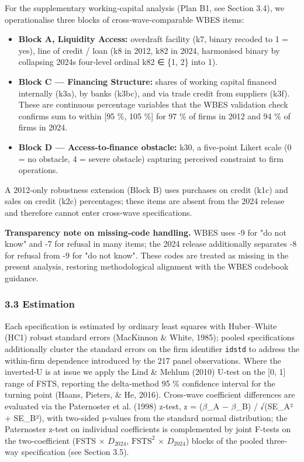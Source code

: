 \documentclass[12pt,a4paper]{article}
\providecommand{\tightlist}{\setlength{\itemsep}{0pt}\setlength{\parskip}{0pt}}
\begin{document}
For the supplementary working‑capital analysis (Plan B1, see Section
3.4), we operationalise three blocks of cross‑wave‑comparable WBES
items:

\begin{itemize}
\tightlist
\item
  \textbf{Block A, Liquidity Access:} overdraft facility (k7, binary
  recoded to 1 = yes), line of credit / loan (k8 in 2012, k82 in 2024,
  harmonised binary by collapsing 2024\textquotesingle s four‑level
  ordinal k82 ∈ \{1, 2\} into 1).
\item
  \textbf{Block C --- Financing Structure:} shares of working capital
  financed internally (k3a), by banks (k3bc), and via trade credit from
  suppliers (k3f). These are continuous percentage variables that the
  WBES validation check confirms sum to within {[}95 \%, 105 \%{]} for
  97 \% of firms in 2012 and 94 \% of firms in 2024.
\item
  \textbf{Block D --- Access‑to‑finance obstacle:} k30, a five‑point
  Likert scale (0 = no obstacle, 4 = severe obstacle) capturing
  perceived constraint to firm operations.
\end{itemize}

A 2012‑only robustness extension (Block B) uses purchases on credit
(k1c) and sales on credit (k2c) percentages; these items are absent from
the 2024 release and therefore cannot enter cross‑wave specifications.

\textbf{Transparency note on missing‑code handling.} WBES uses -9 for
"do not know" and -7 for refusal in many items; the 2024 release
additionally separates -8 for refusal from -9 for "do not know". These
codes are treated as missing in the present analysis, restoring
methodological alignment with the WBES codebook guidance.

\hypertarget{33-estimation}{%
\subsubsection{3.3 Estimation}\label{33-estimation}}

Each specification is estimated by ordinary least squares with
Huber--White (HC1) robust standard errors (MacKinnon \& White, 1985);
pooled specifications additionally cluster the standard errors on the
firm identifier \texttt{idstd} to address the within-firm dependence
introduced by the 217 panel observations. Where the inverted‑U is at
issue we apply the Lind \& Mehlum (2010) U‑test on the {[}0, 1{]} range
of FSTS, reporting the delta‑method 95 \% confidence interval for the
turning point (Haans, Pieters, \& He, 2016). Cross‑wave coefficient
differences are evaluated via the Paternoster et al. (1998) z‑test, z =
(\(\beta\)\_A − \(\beta\)\_B) / √(SE\_A² + SE\_B²), with two‑sided
p‑values from the standard normal distribution; the Paternoster z-test
on individual coefficients is complemented by joint F-tests on the
two-coefficient (FSTS \(\times\) \(D_{2024}\), \(\mathrm{FSTS}^2\)
\(\times\) \(D_{2024}\)) blocks of the pooled three-way specification
(see Section 3.5).
\end{document}
